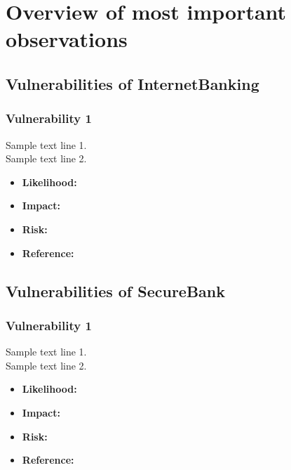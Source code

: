 \chapter{Overview of most important observations}

\section{Vulnerabilities of InternetBanking}

\subsection{Vulnerability 1}
Sample text line 1.\\
Sample text line 2.\\
\begin{itemize}
	\item \textbf{Likelihood:}
	\item \textbf{Impact:}
	\item \textbf{Risk:}
	\item \textbf{Reference:}
\end{itemize}

\section{Vulnerabilities of SecureBank}

\subsection{Vulnerability 1}
Sample text line 1.\\
Sample text line 2.\\
\begin{itemize}
	\item \textbf{Likelihood:}
	\item \textbf{Impact:}
	\item \textbf{Risk:}
	\item \textbf{Reference:}
\end{itemize}